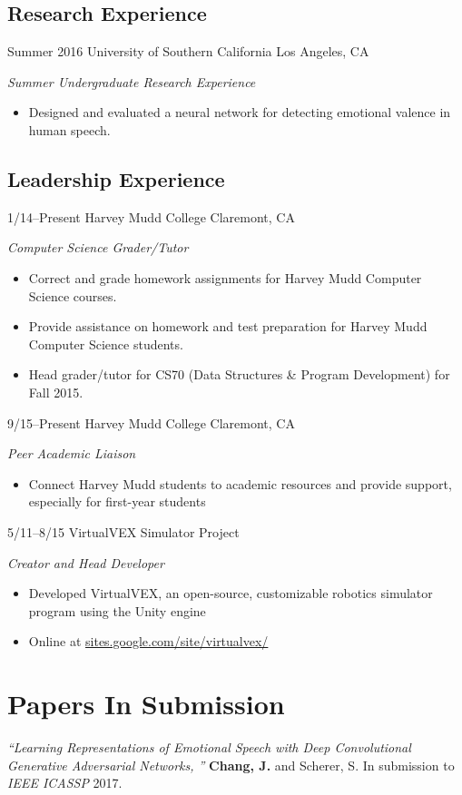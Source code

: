 \documentclass[]{friggeri-cv} %
\begin{document}
\subsection{Research Experience}

\begin{entrylist}

\entry
{Summer 2016}
{University of Southern California}
{Los Angeles, CA}
{\emph{Summer Undergraduate Research Experience}
\begin{itemize}
\item Designed and evaluated a neural network for detecting emotional valence in human speech.
\end{itemize}}

\end{entrylist}

\subsection{Leadership Experience}

\begin{entrylist}

\entry
{1/14--Present}
{Harvey Mudd College}
{Claremont, CA}
{\emph{Computer Science Grader/Tutor}
\begin{itemize}
\item Correct and grade homework assignments for Harvey Mudd Computer Science courses.
\item Provide assistance on homework and test preparation for Harvey Mudd Computer Science students.
\item Head grader/tutor for CS70 (Data Structures \& Program Development) for Fall 2015.
\end{itemize}}


\entry
{9/15--Present}
{Harvey Mudd College}
{Claremont, CA}
{\emph{Peer Academic Liaison}
\begin{itemize}
\item Connect Harvey Mudd students to academic resources and provide support, especially for first-year students
\end{itemize}}


\entry
{5/11--8/15}
{VirtualVEX Simulator Project}
{}
{\emph{Creator and Head Developer}
\begin{itemize}
\item Developed VirtualVEX, an open-source, customizable robotics simulator program using the Unity engine
\item Online at \href{https://sites.google.com/site/virtualvex/}{sites.google.com/site/virtualvex/}
\end{itemize}}

\end{entrylist}

\section{Papers In Submission}

\emph{``Learning Representations of Emotional Speech with Deep
Convolutional Generative Adversarial Networks, ''} \textbf{Chang, J.} and
Scherer, S. In submission to \emph{IEEE ICASSP} 2017.
\end{document}
